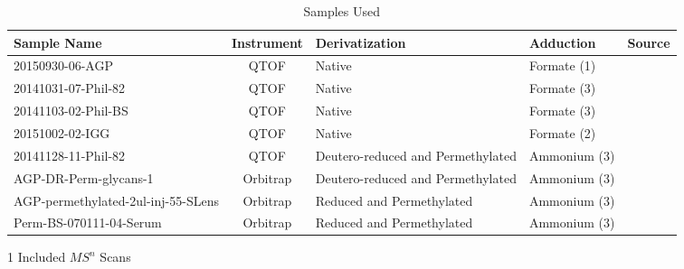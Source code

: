     \begin{table}
        \caption{Samples Used}\label{tab:sample_overview}
        \small
        \centering
        \begin{threeparttable}
        \begin{tabular}{p{4.1cm} | c | p{3cm} | p{3cm} | c}
            \toprule
            Sample Name & Instrument & Derivatization & Adduction & Source\\
            \midrule
            20150930-06-AGP & QTOF & Native & Formate (1) & \cite{Khatri2016a}\\
            20141031-07-Phil-82 & QTOF & Native & Formate (3) & \cite{Khatri2016a}\\
            20141103-02-Phil-BS & QTOF & Native & Formate (3) & \cite{Khatri2016a}\\
            20151002-02-IGG & QTOF & Native & Formate (2) & \cite{Khatri2016b}\\
            20141128-11-Phil-82\tnote{1} & QTOF &
                Deutero-reduced and Permethylated & Ammonium (3) & \cite{Khatri2016a}\\
            AGP-DR-Perm-glycans-1\tnote{1} & Orbitrap &
                Deutero-reduced and Permethylated & Ammonium (3) & \cite{Khatri2016a}\\
            AGP-permethylated-2ul-inj-55-SLens\tnote{1} & Orbitrap &
                Reduced and Permethylated & Ammonium (3) & \cite{Khatri2016a}\\
            Perm-BS-070111-04-Serum\tnote{1} & Orbitrap &
                Reduced and Permethylated & Ammonium (3) & \cite{Yu2013,Hu2012}\\
        \end{tabular}
        \begin{tablenotes}
            \item[1] Included $MS^n$ Scans
        \end{tablenotes}
        \end{threeparttable}
    \end{table}
